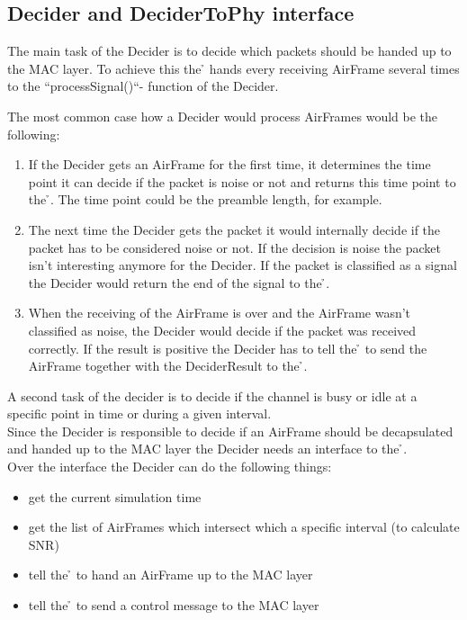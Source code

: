 \subsection{Decider and DeciderToPhy interface}
\label{decider}

The main task of the Decider is to decide which packets should be handed up to
the MAC layer. To achieve this the \h{\bp} hands every receiving AirFrame
several times to the ``processSignal()``- function of the Decider.

\label{ProcessSignal}
The most common case how a Decider would process AirFrames would be the
following:

\begin{enumerate}
 \item If the Decider gets an AirFrame for the first time, it determines the
time point it can decide if the packet is noise or not and returns this time
point to the \h{\bp}. The time point could be the preamble length, for example.

 \item The next time the Decider gets the packet it would internally decide if
the packet has to be considered noise or not. If the decision is noise the
packet isn't interesting anymore for the Decider. If the packet is classified
as a signal the Decider would return the end of the signal to the \h{\bp}.

 \item When the receiving of the AirFrame is over and the AirFrame wasn't
classified as noise, the Decider would decide if the packet was received
correctly. If the result is positive the Decider has to tell the \h{\bp} to
send the AirFrame together with the DeciderResult to the \h{\bm}.
\end{enumerate}

A second task of the decider is to decide if the channel is busy or idle at a
specific point in time or during a given interval.\\

Since the Decider is responsible to decide if an AirFrame should be
decapsulated and handed up to the MAC layer the Decider needs an interface to
the \h{\bp}.\\

Over the interface the Decider can do the following things:

\begin{itemize}
 \item get the current simulation time
 \item get the list of AirFrames which intersect which a specific interval (to
calculate SNR)
 \item tell the \h{\bp} to hand an AirFrame up to the MAC layer
 \item tell the \h{\bp} to send a control message to the MAC layer
\end{itemize}

